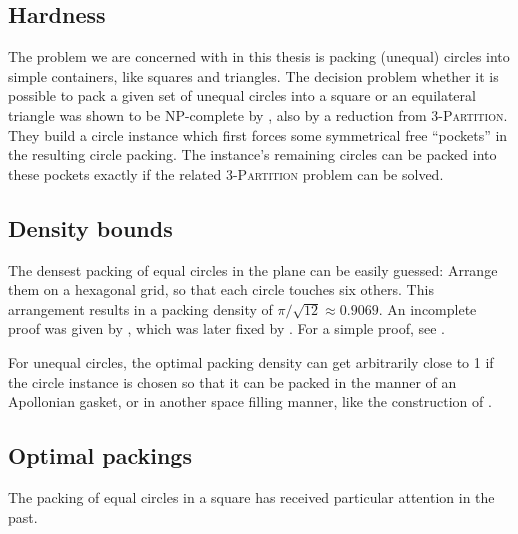 \documentclass[a4paper,style=print,bibliography=totoc,nexus,lnum,extramargin]{tubsbook}
\begin{document}
\subsection{Hardness}

The problem we are concerned with in this thesis is packing (unequal) circles into simple containers, like squares and triangles. The decision problem whether it is possible to pack a given set of unequal circles into a square or an equilateral triangle was shown to be NP-complete by \textcite{DFL2010circle}, also by a reduction from \textsc{3-Partition}. They build a circle instance which first forces some symmetrical free “pockets” in the resulting circle packing. The instance's remaining circles can be packed into these pockets exactly if the related \textsc{3-Partition} problem can be solved.

\subsection{Density bounds}

The densest packing of equal circles in the plane can be easily guessed: Arrange them on a hexagonal grid, so that each circle touches six others. This arrangement results in a packing density of $\pi/\sqrt{12} \approx 0.9069$. An incomplete proof was given by \textcite{thue1892om}, which was later fixed by \textcite{fejestoth1940uber}. For a simple proof, see \cite{CW2010simple}.

For unequal circles, the optimal packing density can get arbitrarily close to 1 if the circle instance is chosen so that it can be packed in the manner of an Apollonian gasket, or in another space filling manner, like the construction of \textcite{bourke2011random}.

\subsection{Optimal packings}

The packing of equal circles in a square has received particular attention in the past.
\end{document}
